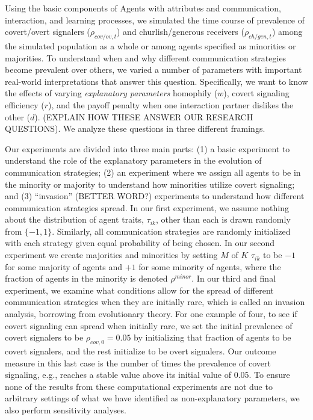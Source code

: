 \documentclass[11pt,letterpaper]{article}
\begin{document}
Using the basic components of Agents with attributes and communication, interaction,
and learning processes, we simulated the time course of prevalence of 
covert/overt signalers ($\rho_{cov/ov,t}$) and churlish/generous receivers 
($\rho_{ch/gen,t}$) among the simulated
population as a whole or among agents specified as minorities or majorities.
To understand when and why different communication strategies become prevalent
over others, we varied a number of parameters with important real-world
interpretations that answer this question. Specifically, we want to know
the effects of varying \emph{explanatory parameters} 
homophily ($w$), covert signaling efficiency ($r$), and the
payoff penalty when one interaction partner dislikes the other ($d$). 
(EXPLAIN HOW THESE ANSWER OUR RESEARCH QUESTIONS). We analyze these questions
in three different framings. 

Our experiments are divided into three main parts: (1) a basic experiment
to understand the role of the explanatory parameters in the evolution of
communication strategies; (2) an experiment where
we assign all agents to be in the
minority or majority to understand how minorities utilize covert signaling;
and (3) ``invasion'' (BETTER WORD?) experiments to understand how different
communication strategies spread. In our first experiment, we assume nothing 
about the distribution of agent traits, $\tau_{ik}$, other than each is 
drawn randomly from $\{-1, 1\}$. Similarly, all communication strategies
are randomly initialized with each strategy given equal probability of
being chosen. In our second experiment we create majorities and minorities
by setting $M$ of $K$ $\tau_{ik}$ to be
$-1$ for some majority of agents and $+1$ for some minority of agents, where
the fraction of agents in the minority is denoted $\rho^{minor}$. 
In our third and final experiment, we examine what conditions allow for the
spread of different communication strategies when they are initially rare,
which is called an invasion analysis, borrowing from evolutionary theory.
For one example of four, to see if covert signaling can spread when initially rare, we
set the initial prevalence of covert signalers to be $\rho_{cov,0}=0.05$ by
initializing that fraction of agents to be covert signalers, and the rest
initialize to be overt signalers. Our outcome measure in this last case is
the number of times the prevalence of covert signaling, e.g., reaches a 
stable value above its initial value of 0.05. To ensure none of the results
from these computational experiments are not due to arbitrary settings of
what we have identified as non-explanatory parameters, we also
perform sensitivity analyses.
\end{document}
